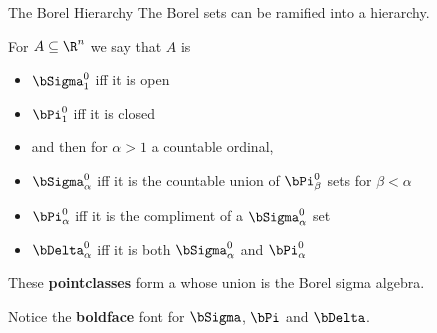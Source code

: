\begin{frame}{The Borel Hierarchy}
The Borel sets can be ramified into a hierarchy.

\pause

For $A\subseteq \R^{n}$ we say that $A$ is

\begin{itemize}
\item  $\bSigma^0_1$ iff it is open
\item  $\bPi^0_1$ iff it is closed
\item and then for $\alpha > 1$ a countable ordinal,
\item $\bSigma^0_{\alpha}$ iff it is the countable union of
       $\bPi^0_{\beta}$ sets for $\beta < \alpha$
\item $\bPi^0_{\alpha}$ iff it is the compliment of a
      $\bSigma^0_{\alpha}$ set
\item $\bDelta^0_{\alpha}$ iff it is both
      $\bSigma^0_{\alpha}$ and $\bPi^0_{\alpha}$
\end{itemize}

\begin{fact}
These \textbf{pointclasses} form a  whose union
is the Borel sigma algebra.
\end{fact}

\begin{remark}
Notice the \textbf{boldface} font for $\bSigma$, $\bPi$ and $\bDelta$.
\end{remark}

\end{frame}
